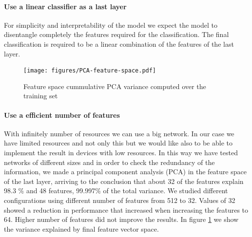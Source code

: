\documentclass[preprint]{elsarticle}
\theoremstyle{definition} %
\theoremstyle{remark}
\begin{document}
\paragraph{Use a linear classifier as a last layer} For simplicity and interpretability of the model we expect the model to disentangle completely the features required for the classification. The final classification is required to be a linear combination of the features of the last layer.

\begin{figure}
	\centering
	\texttt{[image: figures/PCA-feature-space.pdf]}
	\caption{Feature space cummulative PCA variance computed over the training set}
	\label{fig:pca_graph}
\end{figure}

\paragraph{Use a efficient number of features} With infinitely number of resources we can use a big network. In our case we have limited resources and not only this but we would like also to be able to implement the result in devices with low resources. In this way we have tested networks of different sizes and in order to check the redundancy of the information, we made a principal component analysis (PCA) in the feature space of the last layer, arriving to the conclusion that about 32 of the features explain 98.3 \% and 48 features, 99.997\% of the total variance. We studied different configurations using different number of features from 512 to 32. Values of 32 showed a reduction in performance that increased when increasing the features to 64. Higher number of features did not improve the results. In figure \ref{fig:pca_graph} we show the variance explained by final feature vector space.
\end{document}
